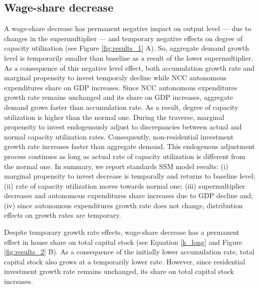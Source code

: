 \documentclass[12pt]{article}
\begin{document}
\subsection{Wage-share decrease}
\label{sec:orga0de266}
\label{sec:Exp1}

A wage-share decrease has permanent negative impact on output level --- due to changes in the supermultiplier --- and temporary negative effects on degree of capacity utilization (see Figure \ref{fig:results_1} A).
So, aggregate demand growth level is temporarily smaller than baseline as a result of the lower supermultiplier.
As a consequence of this negative level effect, both accumulation growth rate and marginal propensity to invest temporaly decline while NCC autonomous expenditures share on GDP increases.
Since NCC autonomous expenditures growth rate remains unchanged and its share on GDP increases, aggregate demand grows faster than accumulation rate.
As a result, degree of capacity utilization is higher than the normal one.
During the traverse, marginal propensity to invest endogenously adjust to discrepancies between actual and normal capacity utilization rates.
Consequently, non-residential investment growth rate increases faster than aggregate demand.
This endogenous adjustment process continues as long as actual rate of capacity utilization is different from the normal one.
In summary, we report standards SSM model results:
    (i) marginal propensity to invest decrease is temporally and returns to baseline level;
    (ii) rate of capacity utilization moves towards normal one;
    (iii) supermultiplier decreases and autonomous expenditures share increases due to GDP decline and; 
    (iv) since autonomous expenditures growth rate does not change, distribution effects on growth rates are temporary. 


Despite temporary growth rate effects, wage-share decrease has a permanent effect in house share on total capital stock (see Equation \ref{k_long} and Figure \ref{fig:results_2} B).
As a consequence of the initially lower accumulation rate, total capital stock also grows at a temporarily lower rate.
However, since residential investment growth rate remains unchanged, its share on total capital stock increases.
\end{document}
